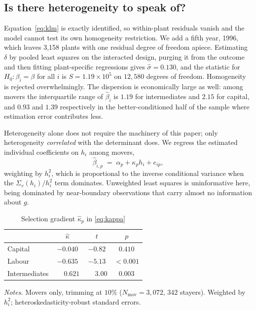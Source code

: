 \documentclass{article}
\begin{document}
\subsection{Is there heterogeneity to speak of?}

Equation~\eqref{eq:klm} is exactly identified, so within-plant residuals vanish
and the model cannot test its own homogeneity restriction. We add a fifth year,
1996, which leaves 3{,}158 plants with one residual degree of freedom apiece.
Estimating $\delta$ by pooled least squares on the interacted design, purging
it from the outcome and then fitting plant-specific regressions gives
$\hat\sigma = 0.130$, and the \citet{Swamy1970} statistic for
$H_0: \beta_i = \beta$ for all $i$ is $S = 1.19 \times 10^{5}$ on $12{,}580$
degrees of freedom. Homogeneity is rejected overwhelmingly. The dispersion is
economically large as well: among movers the interquartile range of
$\hat\beta_i$ is $1.19$ for intermediates and $2.15$ for capital, and $0.93$
and $1.39$ respectively in the better-conditioned half of the sample where
estimation error contributes less.

Heterogeneity alone does not require the machinery of this paper; only
heterogeneity \emph{correlated} with the determinant does. We regress the
estimated individual coefficients on $h_i$ among movers,
\begin{equation}
  \hat\beta_{i,p} \;=\; \alpha_p + \kappa_p h_i + e_{ip},
  \label{eq:kappa}
\end{equation}
weighting by $h_i^2$, which is proportional to the inverse conditional variance
when the $\Sigma_v(h_i)/h_i^{2}$ term dominates. Unweighted least squares is
uninformative here, being dominated by near-boundary observations that carry
almost no information about $g$.

\begin{table}[t]
\centering
\caption{Selection gradient $\hat\kappa_p$ in \eqref{eq:kappa}}
\label{tab:kappa}
\begin{tabular}{lccc}
\toprule
& $\hat\kappa$ & $t$ & $p$ \\
\midrule
Capital       & $-0.040$ & $-0.82$ & $0.410$ \\
Labour        & $-0.635$ & $-5.13$ & $<0.001$ \\
Intermediates & $\phantom{-}0.621$ & $\phantom{-}3.00$ & $0.003$ \\
\bottomrule
\end{tabular}

\vspace{0.6em}
\begin{minipage}{0.92\textwidth}
\footnotesize \emph{Notes.} Movers only, trimming at $10\%$
($N_{\text{mov}} = 3{,}072$, $342$ stayers). Weighted by $h_i^2$;
heteroskedasticity-robust standard errors.
\end{minipage}
\end{table}
\end{document}
